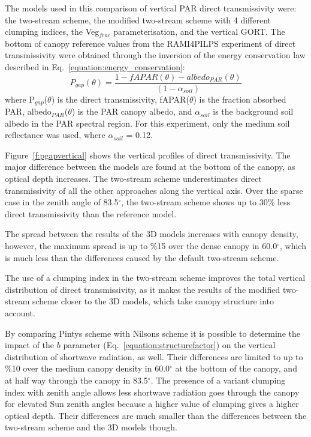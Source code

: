 The models used in this comparison of vertical PAR direct transmissivity were: the two-stream scheme, the modified two-stream scheme with 4 different clumping indices, the Veg$_{frac}$ parameterisation, and the vertical GORT. The bottom of canopy reference values from the RAMI4PILPS experiment of direct transmissivity were obtained through the inversion of the energy conservation law described in Eq.~\ref{equation:energy_conservation}:
 \begin{equation}
P_{gap}(\theta) = \frac{1 - fAPAR(\theta) - albedo_{PAR}(\theta)}{(1 - \alpha_{soil})}
\label{equation:energy_conservation}
\end{equation}
\noindent where P$_{gap}$($\theta$) is the direct transmissivity, fAPAR($\theta$) is the fraction absorbed PAR, albedo$_{PAR}$($\theta$) is the PAR canopy albedo, and $\alpha_{soil}$ is the background soil albedo in the PAR spectral region. For this experiment, only the medium soil reflectance was used, where $\alpha_{soil}$ = 0.12.

Figure~\ref{f:pgapvertical} shows the vertical profiles of direct transmissivity. The major difference between the models are found at the bottom of the canopy, as optical depth increases. The two-stream scheme underestimates direct transmissivity of all the other approaches along the vertical axis. Over the sparse case in the zenith angle of 83.5$^{\circ}$, the two-stream scheme shows up to 30\% less direct transmissivity than the reference model.

The spread between the results of the 3D models increases with canopy density, however, the maximum spread is up to \%15 over the dense canopy in 60.0$^{\circ}$, which is much less than the differences caused by the default two-stream scheme.

The use of a clumping index in the two-stream scheme improves the total vertical distribution of direct transmissivity, as it makes the results of the modified two-stream scheme closer to the 3D models, which take canopy structure into account.

By comparing Pinty\textquotesingle s scheme with Nilson\textquotesingle s scheme it is possible to determine the impact of the $b$ parameter (Eq.~\ref{equation:structurefactor}) on the vertical distribution of shortwave radiation, as well. Their differences are limited to up to \%10 over the medium canopy density in 60.0$^{\circ}$ at the bottom of the canopy, and at half way through the canopy in 83.5$^{\circ}$. The presence of a variant clumping index with zenith angle allows less shortwave radiation goes through the canopy for elevated Sun zenith angles because a higher value of clumping gives a higher optical depth. Their differences are much smaller than the differences between the two-stream scheme and the 3D models though.

